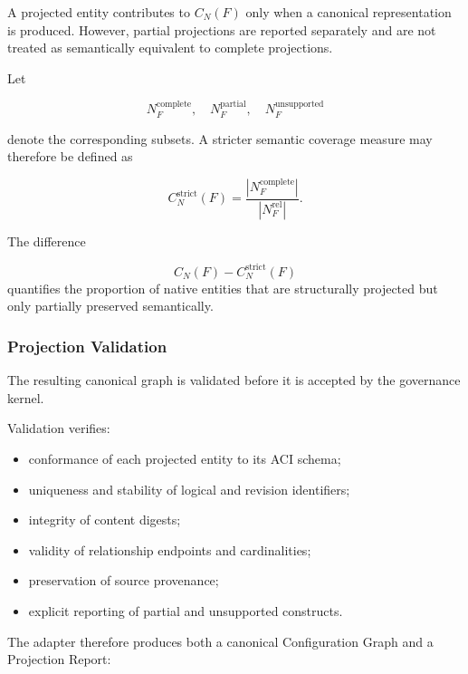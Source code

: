 \documentclass[10pt]{article}
\begin{document}
A projected entity contributes to $C_N(F)$ only when a canonical representation
is produced. However, partial projections are reported separately and are not
treated as semantically equivalent to complete projections.

Let

\begin{equation}
N_F^{\mathrm{complete}},
\quad
N_F^{\mathrm{partial}},
\quad
N_F^{\mathrm{unsupported}}
\end{equation}

denote the corresponding subsets. A stricter semantic coverage measure may
therefore be defined as

\begin{equation}
C_N^{\mathrm{strict}}(F)
=
\frac{
	|N_F^{\mathrm{complete}}|
}{
	|N_F^{\mathrm{rel}}|
}.
\end{equation}

The difference

\begin{equation}
C_N(F)-C_N^{\mathrm{strict}}(F)
\end{equation}
quantifies the proportion of native entities that are structurally projected
but only partially preserved semantically.

\subsubsection{Projection Validation}

The resulting canonical graph is validated before it is accepted by the
governance kernel.

Validation verifies:

\begin{itemize}
	\item conformance of each projected entity to its ACI schema;
	\item uniqueness and stability of logical and revision identifiers;
	\item integrity of content digests;
	\item validity of relationship endpoints and cardinalities;
	\item preservation of source provenance;
	\item explicit reporting of partial and unsupported constructs.
\end{itemize}

The adapter therefore produces both a canonical Configuration Graph and a
Projection Report:
\end{document}
